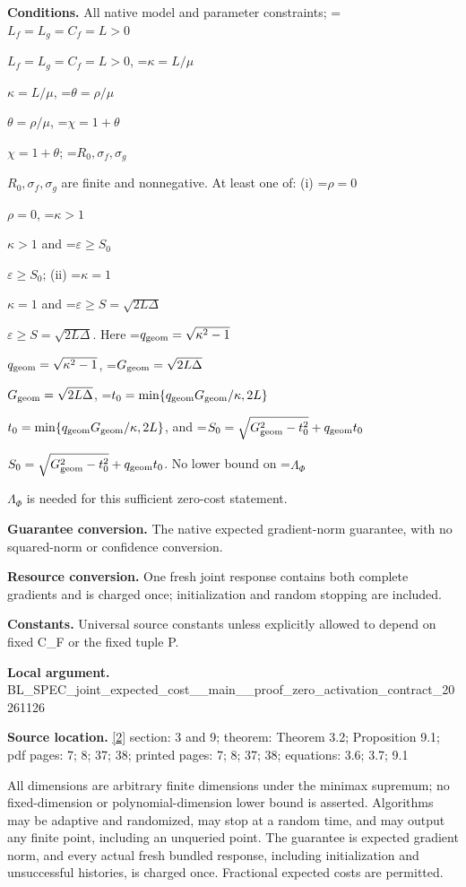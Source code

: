 \documentclass[10pt,a4paper]{article}
\newcommand{\AtlasMath}[1]{\par\begingroup\centering\setbox0=\hbox{$\displaystyle #1$}\ifdim\wd0>1.4\linewidth\typeout{ATLAS WIDE FORMULA: \the\wd0}\fi\ifdim\wd0>\linewidth\resizebox{\linewidth}{!}{\box0}\else\box0\fi\par\endgroup}
\newcommand{\AtlasInlineMath}[1]{\begingroup\setbox0=\hbox{$#1$}\ifdim\wd0>.4\linewidth\endgroup\AtlasMath{#1}\else\endgroup$#1$\fi}
\begin{document}
\textbf{Conditions.} All native model and parameter constraints; \AtlasInlineMath{L_f=L_g=C_f=L>0}, \AtlasInlineMath{\kappa=L/\mu}, \AtlasInlineMath{\theta=\rho/\mu}, \AtlasInlineMath{\chi=1+\theta}; \AtlasInlineMath{R_0,\sigma_f,\sigma_g} are finite and nonnegative. At least one of: (i) \AtlasInlineMath{\rho=0}, \AtlasInlineMath{\kappa>1} and \AtlasInlineMath{\varepsilon\ge S_0}; (ii) \AtlasInlineMath{\kappa=1} and \AtlasInlineMath{\varepsilon\ge S=\sqrt{2L\Delta}}. Here \AtlasInlineMath{q_{\rm geom}=\sqrt{\kappa^2-1}}, \AtlasInlineMath{G_{\rm geom}=\sqrt{2L\Delta}}, \AtlasInlineMath{t_0=\min\{q_{\rm geom}G_{\rm geom}/\kappa,2L\}}, and \AtlasInlineMath{S_0=\sqrt{G_{\rm geom}^2-t_0^2}+q_{\rm geom}t_0}. No lower bound on \AtlasInlineMath{\Lambda_\Phi} is needed for this sufficient zero-cost statement.



\textbf{Guarantee conversion.} The native expected gradient-norm guarantee, with no squared-norm or confidence conversion.



\textbf{Resource conversion.} One fresh joint response contains both complete gradients and is charged once; initialization and random stopping are included.



\textbf{Constants.} Universal source constants unless explicitly allowed to depend on fixed C\_F or the fixed tuple P.



\textbf{Local argument.} BL\_SPEC\_joint\_expected\_c\allowbreak{}ost\_\_main\_\_proof\_zero\_ac\allowbreak{}tivation\_contract\_202611\allowbreak{}26



\textbf{Source location.} \href{https://github.com/WU-Wendao/Colombo/blob/main/colombo_sensorium/Complexity_altas/data/sources/colombo/SFO_JOINT_20261126/manuscript.pdf}{[2]} section: 3 and 9; theorem: Theorem 3.2; Proposition 9.1; pdf pages: 7; 8; 37; 38; printed pages: 7; 8; 37; 38; equations: 3.6; 3.7; 9.1



All dimensions are arbitrary finite dimensions under the minimax supremum; no fixed-dimension or polynomial-dimension lower bound is asserted. Algorithms may be adaptive and randomized, may stop at a random time, and may output any finite point, including an unqueried point. The guarantee is expected gradient norm, and every actual fresh bundled response, including initialization and unsuccessful histories, is charged once. Fractional expected costs are permitted.
\end{document}
